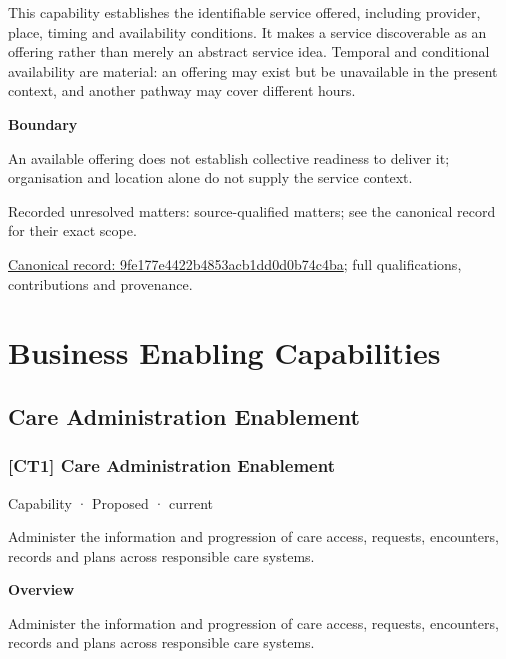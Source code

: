 This capability establishes the identifiable service offered, including provider, place, timing and availability conditions. It makes a service discoverable as an offering rather than merely an abstract service idea. Temporal and conditional availability are material: an offering may exist but be unavailable in the present context, and another pathway may cover different hours.



\textbf{Boundary}



An available offering does not establish collective readiness to deliver it; organisation and location alone do not supply the service context.


{\small Recorded unresolved matters: source-qualified matters; see the canonical record for their exact scope.}\par
{\footnotesize \href{../../../../continuum/strategy/capability/9fe177e4422b4853acb1dd0d0b74c4ba.md}{Canonical record: 9fe177e4422b4853acb1dd0d0b74c4ba}; full qualifications, contributions and provenance.}\par
\section{Business Enabling Capabilities}

\subsection{Care Administration Enablement}

\subsubsection{[CT1] Care Administration Enablement}

\label{element:28df27d55c514a37995145ab46945f78}
{\small Capability · Proposed · current}\par

Administer the information and progression of care access, requests, encounters, records and plans across responsible care systems.



\textbf{Overview}



Administer the information and progression of care access, requests, encounters, records and plans across responsible care systems.



